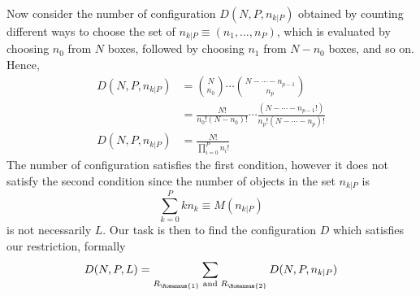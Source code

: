\documentclass[../../../main.tex]{subfiles}
\begin{document}
Now consider the number of configuration $D(N,P,n_{k|P})$ obtained by counting different ways to choose the set of $n_{k|P}\equiv(n_1,\dots,n_P)$, which is evaluated by choosing $n_0$ from $N$ boxes, followed by choosing $n_1$ from $N-n_0$ boxes, and so on. Hence,
\begin{align*}
    D(N,P,n_{k|P}) & ={N\choose n_0}\cdots{N-\cdots-n_{p-1} \choose n_p}                            \\
                   & =\frac{N!}{n_0!(N-n_0)!}\cdots \frac{(N-\cdots-n_{p-1}!)}{n_p!(N-\cdots-n_p)!} \\
    D(N,P,n_{k|P}) & =\frac{N!}{\displaystyle\prod_{i=0}^{P}n_i!}
\end{align*}
The number of configuration satisfies the first condition, however it does not satisfy the second condition since the number of objects in the set $n_{k|P}$ is
\begin{equation*}
    \sum_{k=0}^{P }kn_k\equiv M(n_{k|P})
\end{equation*}
is not necessarily $L$. Our task is then to find the configuration $D$ which satisfies our restriction, formally
\begin{equation*}
    D(N,P,L)=\sum_{R_\Romannum{1}\text{ and }R_\Romannum{2}}D(N,P,n_{k|P})
\end{equation*}
\end{document}
